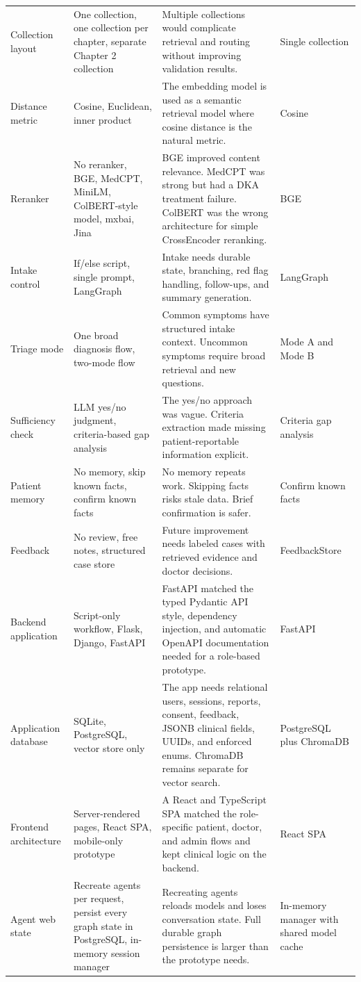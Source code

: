 \begin{longtable}{p{} p{} p{} p{}}
Collection layout & One collection, one collection per chapter, separate Chapter 2 collection & Multiple collections would complicate retrieval and routing without improving validation results. & Single collection\\
Distance metric & Cosine, Euclidean, inner product & The embedding model is used as a semantic retrieval model where cosine distance is the natural metric. & Cosine\\
Reranker & No reranker, BGE, MedCPT, MiniLM, ColBERT-style model, mxbai, Jina & BGE improved content relevance. MedCPT was strong but had a DKA treatment failure. ColBERT was the wrong architecture for simple CrossEncoder reranking. & BGE\\
Intake control & If/else script, single prompt, LangGraph & Intake needs durable state, branching, red flag handling, follow-ups, and summary generation. & LangGraph\\
Triage mode & One broad diagnosis flow, two-mode flow & Common symptoms have structured intake context. Uncommon symptoms require broad retrieval and new questions. & Mode A and Mode B\\
Sufficiency check & LLM yes/no judgment, criteria-based gap analysis & The yes/no approach was vague. Criteria extraction made missing patient-reportable information explicit. & Criteria gap analysis\\
Patient memory & No memory, skip known facts, confirm known facts & No memory repeats work. Skipping facts risks stale data. Brief confirmation is safer. & Confirm known facts\\
Feedback & No review, free notes, structured case store & Future improvement needs labeled cases with retrieved evidence and doctor decisions. & FeedbackStore\\
Backend application & Script-only workflow, Flask, Django, FastAPI & FastAPI matched the typed Pydantic API style, dependency injection, and automatic OpenAPI documentation needed for a role-based prototype. & FastAPI\\
Application database & SQLite, PostgreSQL, vector store only & The app needs relational users, sessions, reports, consent, feedback, JSONB clinical fields, UUIDs, and enforced enums. ChromaDB remains separate for vector search. & PostgreSQL plus ChromaDB\\
Frontend architecture & Server-rendered pages, React SPA, mobile-only prototype & A React and TypeScript SPA matched the role-specific patient, doctor, and admin flows and kept clinical logic on the backend. & React SPA\\
Agent web state & Recreate agents per request, persist every graph state in PostgreSQL, in-memory session manager & Recreating agents reloads models and loses conversation state. Full durable graph persistence is larger than the prototype needs. & In-memory manager with shared model cache\\
\bottomrule
\end{longtable}

